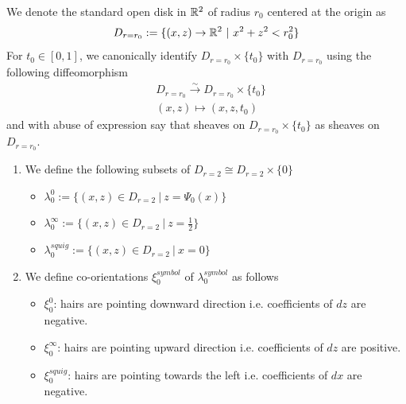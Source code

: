\begin{definition}
We denote the standard open disk in $\mathbb{R}^2$ of radius $r_0$ centered at the origin as 
\[
D_{r=r_0} := \{(x,z)\rightarrow \mathbb{R}^2 ~|~ x^2+z^2 < r_0^2\}
\]
For $t_0 \in [0,1]$, we canonically identify $D_{r=r_0}\times \{t_0\}$ with $D_{r=r_0}$ using the following diffeomorphism
\begin{align*}
& D_{r=r_0} \xrightarrow{\sim} D_{r=r_0} \times \{t_0\} \\
& (x,z) \mapsto (x,z,t_0)
\end{align*}
and with abuse of expression say that sheaves on $D_{r=r_0}\times \{t_0\}$ as sheaves on $D_{r=r_0}$.
\end{definition}

\begin{definition}
\begin{enumerate}
\item We define the following subsets of $D_{r=2} \cong D_{r=2}\times \{0\}$
\begin{itemize}
\item $\lambda_0^0 := \{(x,z) \in D_{r=2} ~|~ z = \Psi_0(x)\}$

\item $\lambda_0^\infty:=\{(x,z) \in D_{r=2} ~|~ z= \frac{1}{2}\}$

\item $\lambda_0^{squig}:=\{(x,z) \in D_{r=2} ~|~ x= 0\}$
\end{itemize}

\item We define co-orientations $\xi_0^{symbol}$ of $\lambda_0^{symbol}$ as follows
\begin{itemize}
\item $\xi_0^0$: hairs are pointing downward direction i.e. coefficients of $dz$ are negative.

\item $\xi_0^\infty$: hairs are pointing upward direction i.e. coefficients of $dz$ are positive.

\item $\xi_0^{squig}$: hairs are pointing towards the left i.e. coefficients of $dx$ are negative.
\end{itemize}
\end{enumerate}
\end{definition}

